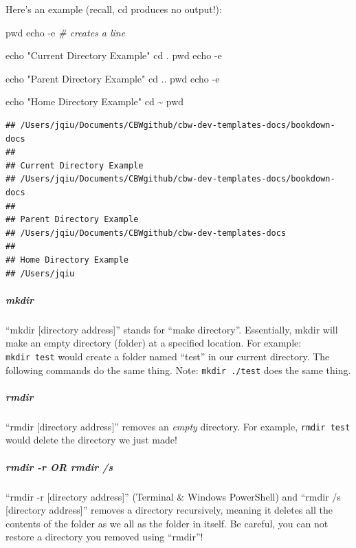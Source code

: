 \documentclass[
]{book}
\newenvironment{Shaded}{\begin{snugshade}}{\end{snugshade}}
\newcommand{\AttributeTok}[1]{\textcolor[rgb]{0.13,0.29,0.53}{#1}}
\newcommand{\BuiltInTok}[1]{#1}
\newcommand{\CommentTok}[1]{\textcolor[rgb]{0.56,0.35,0.01}{\textit{#1}}}
\newcommand{\NormalTok}[1]{#1}
\newcommand{\StringTok}[1]{\textcolor[rgb]{0.31,0.60,0.02}{#1}}
\theoremstyle{definition}
\theoremstyle{definition}
\theoremstyle{definition}
\theoremstyle{definition}
\theoremstyle{remark}
\begin{document}
Here's an example (recall, cd produces no output!):

\begin{Shaded}
\begin{Highlighting}[]
\BuiltInTok{pwd}
\BuiltInTok{echo} \AttributeTok{{-}e} \CommentTok{\# creates a line}

\BuiltInTok{echo} \StringTok{"Current Directory Example"}
\BuiltInTok{cd}\NormalTok{ .}
\BuiltInTok{pwd}
\BuiltInTok{echo} \AttributeTok{{-}e}

\BuiltInTok{echo} \StringTok{"Parent Directory Example"}
\BuiltInTok{cd}\NormalTok{ ..}
\BuiltInTok{pwd}
\BuiltInTok{echo} \AttributeTok{{-}e}

\BuiltInTok{echo} \StringTok{"Home Directory Example"}
\BuiltInTok{cd}\NormalTok{ \textasciitilde{}}
\BuiltInTok{pwd}
\end{Highlighting}
\end{Shaded}

\begin{verbatim}
## /Users/jqiu/Documents/CBWgithub/cbw-dev-templates-docs/bookdown-docs
## 
## Current Directory Example
## /Users/jqiu/Documents/CBWgithub/cbw-dev-templates-docs/bookdown-docs
## 
## Parent Directory Example
## /Users/jqiu/Documents/CBWgithub/cbw-dev-templates-docs
## 
## Home Directory Example
## /Users/jqiu
\end{verbatim}

\subparagraph*{mkdir}\label{mkdir}

``mkdir {[}directory address{]}'' stands for ``make directory''. Essentially, mkdir will make an empty directory (folder) at a specified location. For example: \texttt{mkdir\ test} would create a folder named ``test'' in our current directory. The following commands do the same thing. Note: \texttt{mkdir\ ./test} does the same thing.

\subparagraph*{rmdir}\label{rmdir}

``rmdir {[}directory address{]}'' removes an \emph{empty} directory. For example, \texttt{rmdir\ test} would delete the directory we just made!

\subparagraph*{rmdir -r OR rmdir /s}\label{rmdir--r-or-rmdir-s}

``rmdir -r {[}directory address{]}'' (Terminal \& Windows PowerShell) and ``rmdir /s {[}directory address{]}'' removes a directory recursively, meaning it deletes all the contents of the folder as we all as the folder in itself. Be careful, you can not restore a directory you removed using ``rmdir''!
\end{document}
